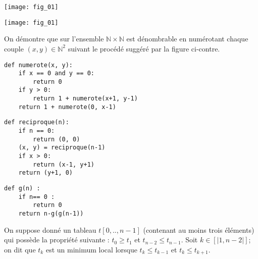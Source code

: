 \setcounter{question}{0}
\ifprof
\begin{center}
\texttt{[image: fig\_01]}
\end{center}
\else
\begin{marginfigure}
\begin{center}
\texttt{[image: fig\_01]}
\end{center}
\end{marginfigure}
\fi
On démontre que sur l'ensemble $\mathbb{N}\times \mathbb{N}$ est dénombrable en numérotant chaque couple $(x,y)\in\mathbb{N}^2$ suivant le procédé suggéré par la figure ci-contre.


\ifprof
\begin{corrige}
\begin{lstlisting}
def numerote(x, y):
    if x == 0 and y == 0:
        return 0
    if y > 0:
        return 1 + numerote(x+1, y-1)
    return 1 + numerote(0, x-1)
\end{lstlisting}
\end{corrige}
\else
\fi

\ifprof
\begin{corrige}
\begin{lstlisting}
def reciproque(n):
    if n == 0:
        return (0, 0)
    (x, y) = reciproque(n-1)
    if x > 0:
        return (x-1, y+1)
    return (y+1, 0)
\end{lstlisting}
\end{corrige}
\else
\fi




\setcounter{question}{0}

\begin{lstlisting}
def g(n) :
    if n== 0 : 
        return 0
    return n-g(g(n-1))
\end{lstlisting}


\exer{}
\setcounter{question}{0}

On suppose donné un tableau $t[0,.., n-1]$ (contenant au moins trois éléments) qui possède la propriété suivante : $t_0\geq t_1$ et $t_{n-2}\leq t_{n-1}$. Soit $k\in[|1,n-2|]$; on dit que $t_k$ est un minimum local lorsque $t_k\leq t_{k-1}$ et $t_k\leq t_{k+1}$.

